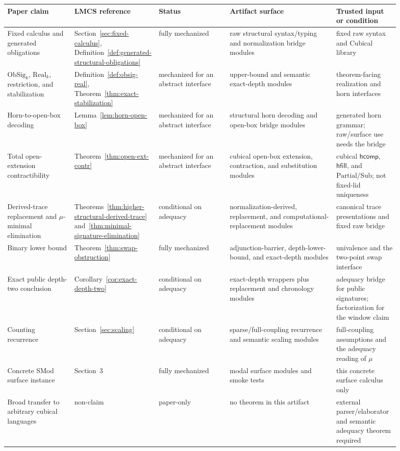 \documentclass{lmcs}
\begin{document}
\begin{center}
\scriptsize
\setlength{\tabcolsep}{2pt}
\begin{tabular}{p{0.17\linewidth}p{0.15\linewidth}p{0.18\linewidth}p{0.27\linewidth}p{0.16\linewidth}}
\hline
Paper claim & LMCS reference & Status & Artifact surface & Trusted input or condition \\
\hline
Fixed calculus and generated obligations
& Section~\ref{sec:fixed-calculus}, Definition~\ref{def:generated-structural-obligations}
& fully mechanized
& raw structural syntax/typing and normalization bridge modules
& fixed raw syntax and Cubical library \\
\hline
\(\mathrm{ObSig}_k\), \(\mathrm{Real}_k\), restriction, and stabilization
& Definition~\ref{def:obsig-real}, Theorem~\ref{thm:exact-stabilization}
& mechanized for an abstract interface
& upper-bound and semantic exact-depth modules
& theorem-facing realization and horn interfaces \\
\hline
Horn-to-open-box decoding
& Lemma~\ref{lem:horn-open-box}
& mechanized for an abstract interface
& structural horn decoding and open-box bridge modules
& generated horn grammar; raw/surface use needs the bridge \\
\hline
Total open-extension contractibility
& Theorem~\ref{thm:open-ext-contr}
& mechanized for an abstract interface
& cubical open-box extension, contraction, and substitution modules
& cubical \(\mathsf{hcomp}\), \(\mathsf{hfill}\), and \(\mathrm{Partial}/\mathrm{Sub}\);
not fixed-lid uniqueness \\
\hline
Derived-trace replacement and \(\mu\)-minimal elimination
& Theorems~\ref{thm:higher-structural-derived-trace}
and~\ref{thm:minimal-signature-elimination}
& conditional on adequacy
& normalization-derived, replacement, and computational-replacement modules
& canonical trace presentations and fixed raw bridge \\
\hline
Binary lower bound
& Theorem~\ref{thm:swap-obstruction}
& fully mechanized
& adjunction-barrier, depth-lower-bound, and exact-depth modules
& univalence and the two-point swap interface \\
\hline
Exact public depth-two conclusion
& Corollary~\ref{cor:exact-depth-two}
& conditional on adequacy
& exact-depth wrappers plus replacement and chronology modules
& adequacy bridge for public signatures; factorization for the window claim \\
\hline
Counting recurrence
& Section~\ref{sec:scaling}
& conditional on adequacy
& sparse/full-coupling recurrence and semantic scaling modules
& full-coupling assumptions and the adequacy reading of \(\mu\) \\
\hline
Concrete SMod surface instance
& Section~3
& fully mechanized
& modal surface modules and smoke tests
& this concrete surface calculus only \\
\hline
Broad transfer to arbitrary cubical languages
& non-claim
& paper-only
& no theorem in this artifact
& external parser/elaborator and semantic adequacy theorem required \\
\hline
\end{tabular}
\end{center}
\end{document}
